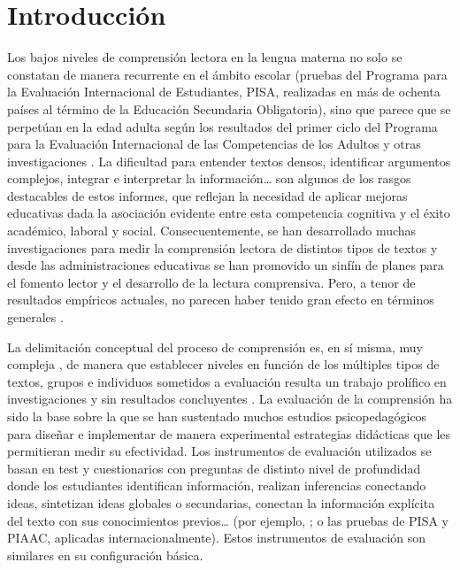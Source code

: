 \documentclass[spanish]{textolivre}
\begin{document}
\begin{polyabstract}
\begin{english}
\begin{abstract}
\end{abstract}
\end{english}
\end{polyabstract}

\section{Introducción}

Los bajos niveles de comprensión lectora en la lengua materna no solo se constatan de manera recurrente en el ámbito escolar (pruebas del Programa para la Evaluación Internacional de Estudiantes, PISA, realizadas en más de ochenta países al término de la Educación Secundaria Obligatoria), sino que parece que se perpetúan en la edad adulta según los resultados del primer ciclo del Programa para la Evaluación Internacional de las Competencias de los Adultos \cite[los resultados del segundo ciclo se publicarán en 2024]{ministerio2013} y otras investigaciones \cite{gatti2020comprension, duche_comprension_2022}. La dificultad para entender textos densos, identificar argumentos complejos, integrar e interpretar la información… son algunos de los rasgos destacables de estos informes, que reflejan la necesidad de aplicar mejoras educativas dada la asociación evidente entre esta competencia cognitiva y el éxito académico, laboral y social. Consecuentemente, se han desarrollado muchas investigaciones para medir la comprensión lectora de distintos tipos de textos y desde las administraciones educativas se han promovido un sinfín de planes para el fomento lector y el desarrollo de la lectura comprensiva. Pero, a tenor de resultados empíricos actuales, no parecen haber tenido gran efecto en términos generales \cite{robledo_ramon_evaluacion_2019, cabrera-pommiez_evaluacion_2021, canquiz-rincon_planeacion_2021}.

La delimitación conceptual del proceso de comprensión es, en sí misma, muy compleja \cite{sole_competencia_2012, cisneros-estupinan_como_2012, guerra-garcia_variables_2017}, de manera que establecer niveles en función de los múltiples tipos de textos, grupos e individuos sometidos a evaluación resulta un trabajo prolífico en investigaciones y sin resultados concluyentes \cite{scott_what_2018, garcia-martin_metodologias_2020}. La evaluación de la comprensión ha sido la base sobre la que se han sustentado muchos estudios psicopedagógicos para diseñar e implementar de manera experimental estrategias didácticas que les permitieran medir su efectividad. Los instrumentos de evaluación utilizados se basan en test y cuestionarios con preguntas de distinto nivel de profundidad donde los estudiantes identifican información, realizan inferencias conectando ideas, sintetizan ideas globales o secundarias, conectan la información explícita del texto con sus conocimientos previos… (por ejemplo, \textcite{vidal2007tec, garcia2013validacion, felipe_morales_diseno_2018}; o las pruebas de PISA y PIAAC, aplicadas internacionalmente). Estos instrumentos de evaluación son similares en su configuración básica.
\end{document}
